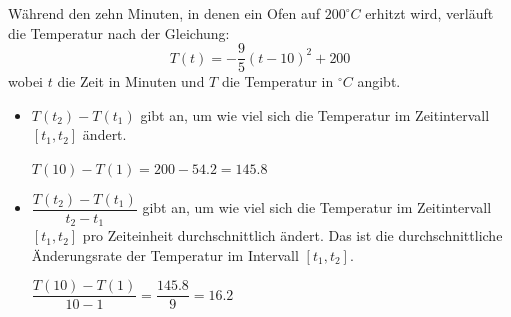 \begin{example}
    Während den zehn Minuten, in denen ein Ofen auf $200^\circ C$ erhitzt wird, verläuft die Temperatur nach der Gleichung:
    \[
        T(t) = -\frac{9}{5} (t-10)^2 + 200
    \]
    wobei $t$ die Zeit in Minuten und $T$ die Temperatur in $^\circ C$ angibt.

    \begin{center}
    \end{center}
    \begin{itemize}
        \item $T(t_2)-T(t_1)$ gibt an, um wie viel sich die Temperatur im Zeitintervall $[t_1,t_2]$ ändert.

              $T(10)-T(1)=200 - 54.2 = 145.8$
        \item $\dfrac{T(t_2)-T(t_1)}{t_2-t_1}$ gibt an, um wie viel sich die Temperatur im Zeitintervall $[t_1,t_2]$ pro Zeiteinheit durchschnittlich ändert. Das ist die durchschnittliche Änderungsrate der Temperatur im Intervall $[t_1,t_2]$.

              $\dfrac{T(10)-T(1)}{10-1}=\dfrac{145.8}{9}=16.2$
    \end{itemize}
\end{example}
\clearpage
